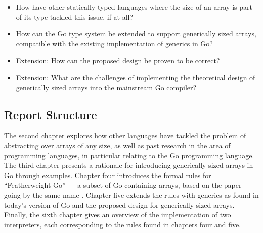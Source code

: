\begin{itemize}
      \item How have other statically typed languages where the size of an array
            is part of its type tackled this issue, if at all?
      \item How can the Go type system be extended to support generically sized
            arrays, compatible with the existing implementation of generics in
            Go?
      \item Extension: How can the proposed design be proven to be correct?
      \item Extension: What are the challenges of implementing the theoretical
            design of generically sized arrays into the mainstream Go compiler?
\end{itemize}


\subsection{Report Structure}

The second chapter explores how other languages have tackled the problem of
abstracting over arrays of any size, as well as past research in the area of
programming languages, in particular relating to the Go programming language.
The third chapter presents a rationale for introducing generically sized arrays
in Go through examples. Chapter four introduces the formal rules for
``Featherweight Go'' --- a subset of Go containing arrays, based on the paper
going by the same name \autocite{fg}. Chapter five extends the rules with
generics as found in today's version of Go and the proposed design for
generically sized arrays. Finally, the sixth chapter gives an overview of the
implementation of two interpreters, each corresponding to the rules found in
chapters four and five.

